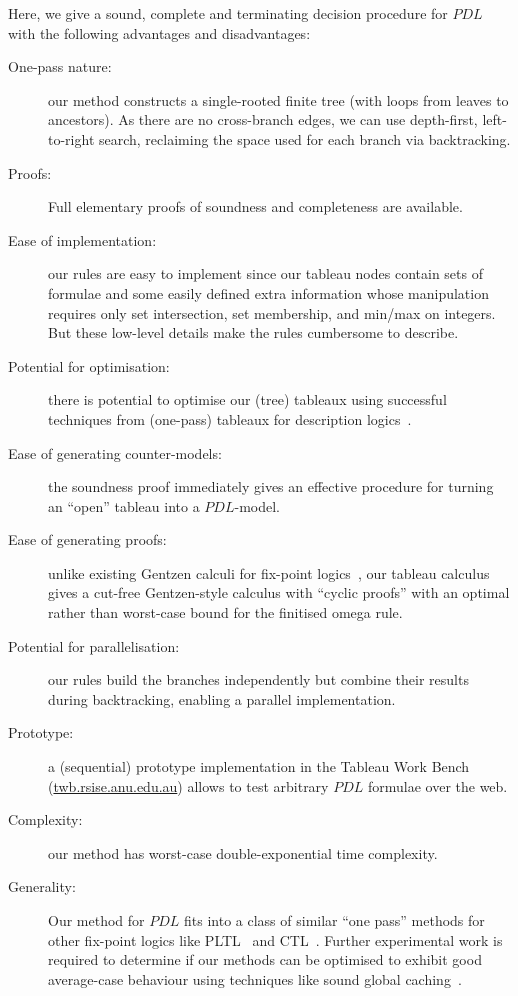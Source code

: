 \documentclass{entcs}
\newcommand{\pdl}{$PDL$}
\begin{document}
Here, we give a sound, complete and terminating decision procedure for \pdl{}
with the following advantages and disadvantages:
\begin{description}
\item[\rm One-pass nature:] our method constructs a single-rooted finite tree
  (with loops from leaves to ancestors).
  As there are no cross-branch edges, 
  we can use depth-first, left-to-right search,
  reclaiming the space used for each branch via backtracking.
\item[\rm Proofs:] Full elementary proofs of soundness and completeness are available.
\item[\rm Ease of implementation:] our rules are easy to implement
  since our tableau nodes contain sets of formulae
  and some easily defined extra information
  whose manipulation requires only set intersection, set membership,
  and min/max on integers.
  But these low-level details make the rules cumbersome to describe.
\item[\rm Potential for optimisation:] there is potential
  to optimise our (tree) tableaux
  using successful techniques from (one-pass) tableaux
  for description logics~\cite{horrocks-patel-schneider-optimising-description-logic}.
\item[\rm Ease of generating counter-models:] the soundness proof immediately gives
  an effective procedure for turning an ``open'' tableau into a \pdl{}-model.
\item[\rm Ease of generating proofs:] unlike existing Gentzen calculi
  for fix-point logics~\cite{alberucci-jaeger-lck,kretz-studer-jaeger-lck-cut-free},
  our tableau calculus gives a cut-free Gentzen-style calculus
  with ``cyclic proofs'' with an optimal rather than worst-case bound
  for the finitised omega rule.
\item[\rm Potential for parallelisation:] our rules build the branches independently
  but combine their results during backtracking,
  enabling a parallel implementation.
\item[\rm Prototype:] a (sequential) prototype implementation
  in the Tableau Work Bench
  (\url{twb.rsise.anu.edu.au})
  allows to test arbitrary \pdl{} formulae over the web.
\item[\rm Complexity:] our method has worst-case double-exponential time complexity.
\item[\rm Generality:] Our method for \pdl{}
  fits into a class of similar ``one pass'' methods
  for other fix-point logics like
  PLTL~\cite{schwendimann-one-pass} and
  CTL~\cite{abate-gore-widmann-onepass-ctl-lpar}. 
  Further experimental work is required to determine
  if our methods can be optimised to exhibit good average-case behaviour
  using techniques like sound global caching~\cite{gore-nguyen-exptime-alc}.
\end{description}
\end{document}
